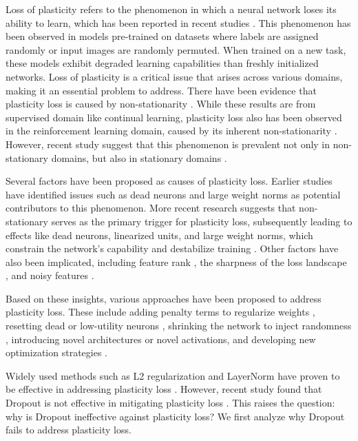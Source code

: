 

Loss of plasticity refers to the phenomenon in which a neural network loses its ability to learn, which has been reported in recent studies \cite{lyle2023understanding, dohare2021continual}.
This phenomenon has been observed in models pre-trained on datasets where labels are assigned randomly or input images are randomly permuted.
When trained on a new task, these models exhibit degraded learning capabilities than freshly initialized networks.
Loss of plasticity is a critical issue that arises across various domains, making it an essential problem to address.
There have been evidence that plasticity loss is caused by non-stationarity \cite{lyle2024disentangling}.
While these results are from supervised domain like continual learning, plasticity loss also has been observed in the reinforcement learning domain, caused by its inherent non-stationarity \cite{sokar2023dormant, kumar2020implicit}.
However, recent study suggest that this phenomenon is prevalent not only in non-stationary domains, but also in stationary domains \cite{lee2024slow}.



Several factors have been proposed as causes of plasticity loss.
Earlier studies have identified issues such as dead neurons \cite{sokar2023dormant} and large weight norms \cite{lyle2023understanding} as potential contributors to this phenomenon.
More recent research suggests that non-stationary serves as the primary trigger for plasticity loss, subsequently leading to effects like dead neurons, linearized units, and large weight norms, which constrain the network's capability and destabilize training \cite{lyle2024disentangling}.
Other factors have also been implicated, including feature rank \cite{kumar2020implicit}, the sharpness of the loss landscape \cite{lyle2023understanding}, and noisy features \cite{shindash}.

Based on these insights, various approaches have been proposed to address plasticity loss.
These include adding penalty terms to regularize weights \cite{kumar2023maintaining, gogianu2021spectral}, resetting dead or low-utility neurons \cite{dohare2021continual, dohare2023maintaining, sokar2023dormant}, shrinking the network to inject randomness \cite{ash2020warm, shindash}, introducing novel architectures \cite{lee2024slow} or novel activations\cite{abbas2023loss, lewandowski2024plastic}, and developing new optimization strategies \cite{elsayed2024addressing}.

Widely used methods such as L2 regularization and LayerNorm \cite{ba2016layer} have proven to be effective in addressing plasticity loss \cite{lyle2024disentangling}.
However, recent study found that Dropout is not effective in mitigating plasticity loss \cite{dohare2024loss}.
This raises the question: why is Dropout ineffective against plasticity loss?
We first analyze why Dropout fails to address plasticity loss.

